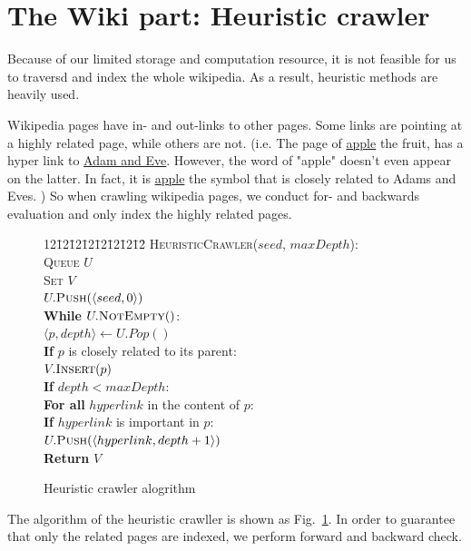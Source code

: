 \documentclass[12pt]{amsart}
\newcommand{\0}{\mat{0}}
\newcommand{\1}{\mathds{1}}
\newenvironment{code}{\begin{tabbing}
    12\=12\=12\=12\=12\=12\=12\=12\= \kill }
  {\end{tabbing}}
\begin{document}
\section{The Wiki part: Heuristic crawler}
\label{sec:wiki}
Because of our limited storage and computation resource, it is not feasible for us to traversd and index the whole wikipedia. As a result, heuristic methods are heavily used.

Wikipedia pages have in- and out-links to other pages. Some links are pointing at a highly related page, while others are not. (i.e. The page of \href{https://en.wikipedia.org/wiki/Apple}{apple} the fruit, has a hyper link to \href{https://en.wikipedia.org/wiki/Adam_and_Eve}{Adam and Eve}. However, the word of "apple" doesn't even appear on the latter. In fact, it is \href{https://en.wikipedia.org/wiki/Apple_(symbolism)}{apple} the symbol that is closely related to Adams and Eves. ) So when crawling wikipedia pages, we conduct for- and backwards evaluation and only index the highly related pages. 

\begin{figure}[htb]
\begin{code}
\textsc{HeuristicCrawler}($seed$, $maxDepth$): \\
\> \textsc{Queue} $U$ \\
\> \textsc{Set} $V$ \\
\> $U.\textsc{Push}(\langle seed, 0 \rangle)$ \\
\> \textbf{While} $U.\textsc{NotEmpty}()$: \\
\>\> $ \langle p, depth \rangle \leftarrow U.Pop()$ \\
\>\> \textbf{If} $p$ is closely related to its parent: \\
\>\>\> $V.\textsc{Insert}(p)$ \\
\>\> \textbf{If} $depth < maxDepth$: \\
\>\>\> \textbf{For all} $hyperlink$ in the content of $p$: \\
\>\>\>\> \textbf{If} $hyperlink$ is important in $p$: \\
\>\>\>\>\> $U.\textsc{Push}(\langle hyperlink, depth+1 \rangle)$\\ 
\> \textbf{Return} $V$
\end{code}
\caption{Heuristic crawler alogrithm}
\label{al:crawler}
\end{figure}

The algorithm of the heuristic crawller is shown as Fig.~\ref{al:crawler}. In order to guarantee that only the related pages are indexed, we perform forward and backward check. 
\end{document}
